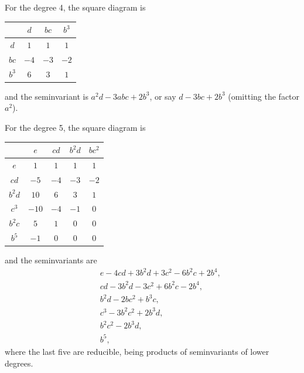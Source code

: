 \documentclass[11pt,a4paper]{book}
\begin{document}
{{{\setcounter{art}{40}
\begin{art}
For the degree 4, the square diagram is
\begin{center}
\begin{tabular}{c|ccc}
 & $d$ & $bc$ & $b^{3}$ \\
\hline
$d$ & $1$ & $1$ & $1$ \\
$bc$ & $-4$ & $-3$ & $-2$ \\
$b^{3}$ & $6$ & $3$ & $1$ \\
\end{tabular}
\end{center}
and the seminvariant is $a^{2}d - 3abc + 2b^{3}$, or say $d - 3bc + 2b^{3}$ (omitting the factor $a^{2}$).
\end{art}

\setcounter{art}{41}
\begin{art}
For the degree 5, the square diagram is
\begin{center}
\begin{tabular}{c|cccc}
 & $e$ & $cd$ & $b^{2}d$ & $bc^{2}$ \\
\hline
$e$ & $1$ & $1$ & $1$ & $1$ \\
$cd$ & $-5$ & $-4$ & $-3$ & $-2$ \\
$b^{2}d$ & $10$ & $6$ & $3$ & $1$ \\
$c^{3}$ & $-10$ & $-4$ & $-1$ & $0$ \\
$b^{2}c$ & $5$ & $1$ & $0$ & $0$ \\
$b^{5}$ & $-1$ & $0$ & $0$ & $0$ \\
\end{tabular}
\end{center}
and the seminvariants are
\begin{align*}
&\phantom{+}e - 4cd + 3b^{2}d + 3c^{2} - 6b^{2}c + 2b^{4},\\
&\phantom{+}cd - 3b^{2}d - 3c^{2} + 6b^{2}c - 2b^{4},\\
&\phantom{+}b^{2}d - 2bc^{2} + b^{3}c,\\
&\phantom{+}c^{3} - 3b^{2}c^{2} + 2b^{3}d,\\
&\phantom{+}b^{2}c^{2} - 2b^{3}d,\\
&\phantom{+}b^{5},
\end{align*}
where the last five are reducible, being products of seminvariants of lower degrees.
\end{art}

}}}
\end{document}
